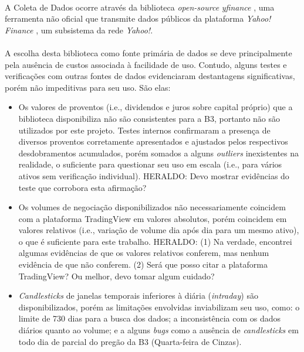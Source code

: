 \paragraph{} A Coleta de Dados ocorre através da biblioteca \textit{open-source} \textit{yfinance} \cite{yfinance}, uma ferramenta não oficial que transmite dados públicos da plataforma \textit{Yahoo! Finance} \cite{yahoo_finance}, um subsistema da rede \textit{Yahoo!}.

\paragraph{} A escolha desta biblioteca como fonte primária de dados se deve principalmente pela ausência de custos associada à facilidade de uso. Contudo, alguns testes e verificações com outras fontes de dados evidenciaram destantagens significativas, porém não impeditivas para seu uso. São elas:

\begin{itemize}
    \item Os valores de proventos (i.e., dividendos e juros sobre capital próprio) que a biblioteca disponibiliza não são consistentes para a B3, portanto não são utilizados por este projeto. Testes internos confirmaram a presença de diversos proventos corretamente apresentados e ajustados pelos respectivos desdobramentos acumulados, porém somados a alguns \textit{outliers} inexistentes na realidade, o suficiente para questionar seu uso em escala (i.e., para vários ativos sem verificação individual). \color{red} HERALDO: Devo mostrar evidências do teste que corrobora esta afirmação? 

    \item Os volumes de negociação disponibilizados não necessariamente coincidem com a plataforma TradingView em valores absolutos, porém coincidem em valores relativos (i.e., variação de volume dia após dia para um mesmo ativo), o que é suficiente para este trabalho. \color{red} HERALDO: (1) Na verdade, encontrei algumas evidências de que os valores relativos conferem, mas nenhum evidência de que não conferem. (2) Será que posso citar a plataforma TradingView? Ou melhor, devo tomar algum cuidado? 

    \item \textit{Candlesticks} de janelas temporais inferiores à diária (\textit{intraday}) são disponibilizados, porém as limitações envolvidas inviabilizam seu uso, como: o limite de 730 dias para a busca dos dados; a inconsistência com os dados diários quanto ao volume; e a alguns \textit{bugs} como a ausência de \textit{candlesticks} em todo dia de parcial do pregão da B3 (Quarta-feira de Cinzas).
\end{itemize}

